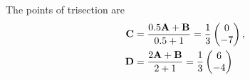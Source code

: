 The points of trisection are
 \begin{align}
\mathbf{C} &= \frac{0.5\mathbf{A}+\mathbf{B}}{0.5+1}=\frac{1}{3}\begin{pmatrix}0\\-7\end{pmatrix}, \\
\mathbf{D} &= \frac{2\mathbf{A}+\mathbf{B}}{2+1} = \frac{1}{3}\begin{pmatrix}6\\-4\end{pmatrix}
\end{align}
